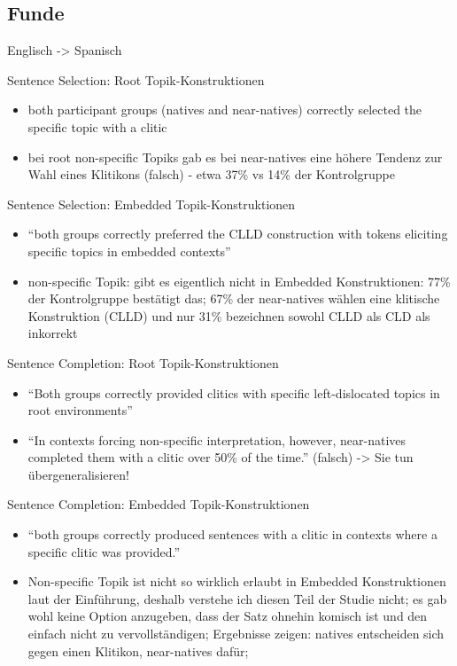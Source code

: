 \subsection{Funde}

Englisch -> Spanisch

Sentence Selection: Root Topik-Konstruktionen
\begin{itemize}
    \item both participant groups (natives and near-natives) correctly selected the specific topic with a clitic
    \item bei root non-specific Topiks gab es bei near-natives eine höhere Tendenz zur Wahl eines Klitikons (falsch) - etwa 37\% vs 14\% der Kontrolgruppe
\end{itemize}

Sentence Selection: Embedded Topik-Konstruktionen
\begin{itemize}
    \item ``both groups correctly preferred the CLLD construction with tokens eliciting specific topics in embedded contexts''
    \item non-specific Topik: gibt es eigentlich nicht in Embedded Konstruktionen: 77\% der Kontrolgruppe bestätigt das; 67\% der near-natives wählen eine klitische Konstruktion (CLLD) und nur 31\% bezeichnen sowohl CLLD als CLD als inkorrekt
\end{itemize}

Sentence Completion: Root Topik-Konstruktionen
\begin{itemize}
    \item ``Both groups correctly provided clitics with specific left-dislocated topics in root environments''
    \item ``In contexts forcing non-specific interpretation, however, near-natives completed them with a clitic over 50\% of the time.'' (falsch)
       -> Sie tun übergeneralisieren!

\end{itemize}

Sentence Completion: Embedded Topik-Konstruktionen
\begin{itemize}
    \item ``both groups correctly produced sentences with a clitic in contexts where a specific clitic was provided.''
    \item Non-specific Topik ist nicht so wirklich erlaubt in Embedded Konstruktionen laut der Einführung, deshalb verstehe ich diesen Teil der Studie nicht;
        es gab wohl keine Option anzugeben, dass der Satz ohnehin komisch ist und den einfach nicht zu vervollständigen;
        Ergebnisse zeigen: natives entscheiden sich gegen einen Klitikon, near-natives dafür;
\end{itemize}

